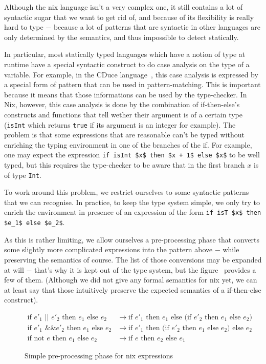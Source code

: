 Although the nix language isn't a very complex one, it still contains a lot of
syntactic sugar that we want to get rid of, and because of its flexibility is
really hard to type − because a lot of patterns that are syntactic in other
languages are only determined by the semantics, and thus impossible to detect
statically.

In particular, most statically typed languages which have a notion of type at
runtime have a special syntactic construct to do case analysis on the type of
a variable. For example, in the CDuce language~\cite{Fri04}, this case
analysis is expressed by a special form of pattern that can be used in
pattern-matching. This is important because it means that those informations
can be used by the type-checker. In Nix, however, this case analysis is done by
the combination of if-then-else's constructs and functions that tell wether
their argument is of a certain type (\lstinline{isInt} which returns
\lstinline{true} if its argument is an integer for example).
The problem is that some expressions that are reasonable can't be typed without
enriching the typing environment in one of the branches of the if. For example,
one may expect the expression \lstinline{if isInt $x$ then $x + 1$ else $x$} to
be well typed, but this requires the type-checker to be aware that in the first
branch $x$ is of type \lstinline{Int}.

To work around this problem, we restrict ourselves to some syntactic patterns
that we can recognise. In practice, to keep the type system simple, we only try
to enrich the environment in presence of an expression of the form
\lstinline{if isT $x$ then $e_1$ else $e_2$}.

As this is rather limiting, we allow ourselves a pre-processing phase that
converts some slightly more complicated expressions into the pattern above −
while preserving the semantics of course.
The list of those conversions may be expanded at will − that's why it is kept
out of the type system, but the figure~
provides a few of them. (Although we did not give any formal semantics for nix
yet, we can at least say that those intuitively preserve the expected semantics
of a if-then-else construct).

\begin{figure}
  \begin{align}
    \text{if $e'_1$ || $e'_2$ then $e_1$ else $e_2$} &\rightarrow
      \text{if $e'_1$ then $e_1$ else (if $e'_2$ then $e_1$ else $e_2$)} \\
    \text{if $e'_1$ \&\& $e'_2$ then $e_1$ else $e_2$} &\rightarrow
      \text{if $e'_1$ then (if $e'_2$ then $e_1$ else $e_2)$ else $e_2$} \\
    \text{if not $e$ then $e_1$ else $e_2$} &\rightarrow
      \text{if $e$ then $e_2$ else $e_1$}
  \end{align}
  \caption{Simple pre-processing phase for nix expressions}\label{semantics::pre-processing}
\end{figure}
